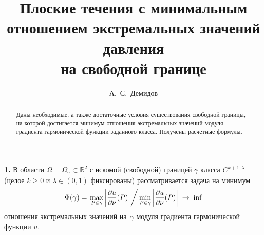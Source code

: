 \fi

\title{Плоские течения с минимальным отношением экстремальных значений давления\\ на свободной границе
}
\author{А.~С.~Демидов 
} %

\maketitle

\begin{abstract}
Даны необходимые, а также достаточные условия существования свободной границы, 
на которой достигается минимум отношения экстремальных значений модуля градиента 
гармонической функции заданного класса. Получены расчетные формулы.

\end{abstract}

{\bf 1.} В области $\Omega=\Omega_{\gamma}\subset\mathbb{R}^2$ с искомой (свободной) 
границей ${\gamma}$ класса $C^{k+1,\lambda}$ (целое $k\ge 0$ и $\lambda\in(0,1)$
фиксированы) рассматривается задача на минимум
\begin{equation}
 \label{MINIM}
\Phi(\gamma)=\left.\max_{P\in \gamma}\left|\frac{\partial u}{\partial\nu}
(P)\right|\right/ \min_{P\in \gamma}\left|\frac{\partial u}{\partial\nu}
(P)\right|\; \to\;\inf
\end{equation}
отношения экстремальных значений на~${\gamma}$ модуля градиента гармонической 
функции $u$. 

